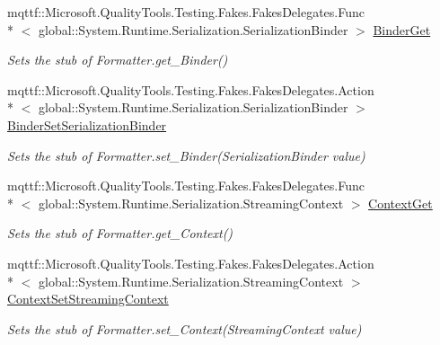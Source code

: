 \begin{DoxyCompactItemize}
\item 
mqttf\-::\-Microsoft.\-Quality\-Tools.\-Testing.\-Fakes.\-Fakes\-Delegates.\-Func\\*
$<$ global\-::\-System.\-Runtime.\-Serialization.\-Serialization\-Binder $>$ \hyperlink{class_system_1_1_runtime_1_1_serialization_1_1_fakes_1_1_stub_formatter_a60838b42520cedc66b3c598d78836bb0}{Binder\-Get}
\begin{DoxyCompactList}\small\item\em Sets the stub of Formatter.\-get\-\_\-\-Binder()\end{DoxyCompactList}\item 
mqttf\-::\-Microsoft.\-Quality\-Tools.\-Testing.\-Fakes.\-Fakes\-Delegates.\-Action\\*
$<$ global\-::\-System.\-Runtime.\-Serialization.\-Serialization\-Binder $>$ \hyperlink{class_system_1_1_runtime_1_1_serialization_1_1_fakes_1_1_stub_formatter_ad51cfb2e350aa409e0e63860b41a99e4}{Binder\-Set\-Serialization\-Binder}
\begin{DoxyCompactList}\small\item\em Sets the stub of Formatter.\-set\-\_\-\-Binder(\-Serialization\-Binder value)\end{DoxyCompactList}\item 
mqttf\-::\-Microsoft.\-Quality\-Tools.\-Testing.\-Fakes.\-Fakes\-Delegates.\-Func\\*
$<$ global\-::\-System.\-Runtime.\-Serialization.\-Streaming\-Context $>$ \hyperlink{class_system_1_1_runtime_1_1_serialization_1_1_fakes_1_1_stub_formatter_a52215e5ba83f803039624cce18647079}{Context\-Get}
\begin{DoxyCompactList}\small\item\em Sets the stub of Formatter.\-get\-\_\-\-Context()\end{DoxyCompactList}\item 
mqttf\-::\-Microsoft.\-Quality\-Tools.\-Testing.\-Fakes.\-Fakes\-Delegates.\-Action\\*
$<$ global\-::\-System.\-Runtime.\-Serialization.\-Streaming\-Context $>$ \hyperlink{class_system_1_1_runtime_1_1_serialization_1_1_fakes_1_1_stub_formatter_aa5660fcc1b967cb5dbbd16fb94849452}{Context\-Set\-Streaming\-Context}
\begin{DoxyCompactList}\small\item\em Sets the stub of Formatter.\-set\-\_\-\-Context(\-Streaming\-Context value)\end{DoxyCompactList}\item 

\end{DoxyCompactItemize}
